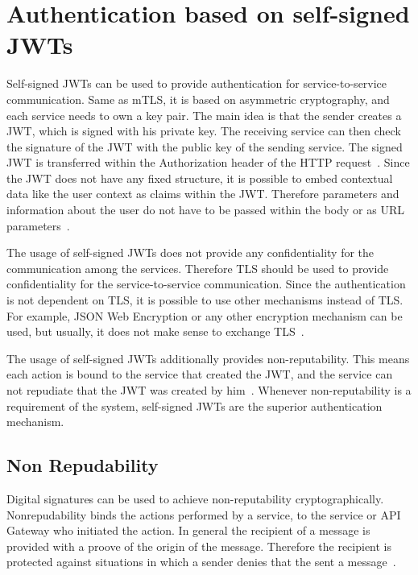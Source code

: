 \section{Authentication based on self-signed JWTs}
Self-signed JWTs can be used to provide authentication for service-to-service communication.
Same as mTLS, it is based on asymmetric cryptography, and each service needs to own a key pair.
The main idea is that the sender creates a JWT, which is signed with his private key.
The receiving service can then check the signature of the JWT with the public key of the sending service.
The signed JWT is transferred within the Authorization header of the HTTP request~\cite{dias2020microservices}.
Since the JWT does not have any fixed structure, it is possible to embed contextual data like the user context as claims within the JWT.
Therefore parameters and information about the user do not have to be passed within the body or as URL parameters~\cite{dias2020microservices}.


The usage of self-signed JWTs does not provide any confidentiality for the communication among the services.
Therefore TLS should be used to provide confidentiality for the service-to-service communication.
Since the authentication is not dependent on TLS, it is possible to use other mechanisms instead of TLS.
For example, JSON Web Encryption or any other encryption mechanism can be used, but usually, it does not make sense to exchange TLS~\cite{dias2020microservices}.

The usage of self-signed JWTs additionally provides non-reputability.
This means each action is bound to the service that created the JWT, and the service can not repudiate that the JWT was created by him~\cite{dias2020microservices}.
Whenever non-reputability is a requirement of the system, self-signed JWTs are the superior authentication mechanism.

\subsection{Non Repudability}
Digital signatures can be used to achieve non-reputability cryptographically.
Nonrepudability binds the actions performed by a service, to the service or API Gateway who initiated the action.
In general the recipient of a message is provided with a proove of the origin of the message.
Therefore the recipient is protected against situations in which a sender denies that the sent a message~\cite{wu20131200}.


